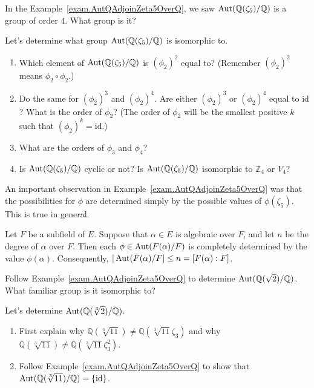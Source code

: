 In the Example~\ref{exam.AutQAdjoinZeta5OverQ}, we saw  $\operatorname{Aut}(\mathbb{Q}(\zeta_5)/\mathbb{Q})$ is a group of order $4$. What group is it? 

\begin{problem}
Let's determine what group $\operatorname{Aut}(\mathbb{Q}(\zeta_5)/\mathbb{Q})$ is isomorphic to. 
\begin{enumerate}
\item Which element of $\operatorname{Aut}(\mathbb{Q}(\zeta_5)/\mathbb{Q})$ is $(\phi_2)^2$ equal to? (Remember $(\phi_2)^2$ means $\phi_2\circ\phi_2$.)
\item Do the same for $(\phi_2)^3$ and $(\phi_2)^4$. Are either $(\phi_2)^3$ or $(\phi_2)^4$ equal to $\text{id}$? What is the order of $\phi_2$? (The order of $\phi_2$ will be the smallest positive $k$ such that $(\phi_2)^k = \text{id}$.)
\item What are the orders of $\phi_3$ and $\phi_4$?
\item Is $\operatorname{Aut}(\mathbb{Q}(\zeta_5)/\mathbb{Q})$ cyclic or not? Is $\operatorname{Aut}(\mathbb{Q}(\zeta_5)/\mathbb{Q})$ isomorphic to $\mathbb{Z}_4$ or $V_4$?
\end{enumerate}
\end{problem}

An important observation in Example~\ref{exam.AutQAdjoinZeta5OverQ} was that the possibilities for $\phi$ are determined simply by the possible values of $\phi(\zeta_5)$. This is true in general.

\begin{fact}\label{fact.AutDeterminedOnGenerator}
Let $F$ be a subfield of $E$. Suppose that $\alpha\in E$ is algebraic over $F$, and let $n$ be the degree of $\alpha$ over $F$. Then each $\phi\in \operatorname{Aut}({F}(\alpha)/F)$ is completely determined by the value $\phi(\alpha)$. Consequently,  $|\operatorname{Aut}({F}(\alpha)/F|\le n = [F(\alpha):F]$.
\end{fact}

\begin{problem}\label{prob.AutQAdjoinSqrt2OverQ}
Follow Example~\ref{exam.AutQAdjoinZeta5OverQ} to determine $\operatorname{Aut}(\mathbb{Q}(\sqrt{2})/\mathbb{Q})$.
What familiar group is  it isomorphic to?
\end{problem}

\begin{problem}\label{prob.AutQAdjoinCubeRoot2OverQ}
Let's determine $\operatorname{Aut}(\mathbb{Q}(\sqrt[3]{2})/\mathbb{Q})$.
\begin{enumerate}
\item First explain why  $\mathbb{Q}(\sqrt[3]{11})\neq \mathbb{Q}(\sqrt[3]{11}\zeta_3)$ and why $\mathbb{Q}(\sqrt[3]{11})\neq \mathbb{Q}(\sqrt[3]{11}\zeta_3^2)$.
\item Follow Example~\ref{exam.AutQAdjoinZeta5OverQ} to show that $\operatorname{Aut}(\mathbb{Q}(\sqrt[3]{11})/\mathbb{Q}) = \{\text{id}\}$.
\end{enumerate}
\end{problem}

